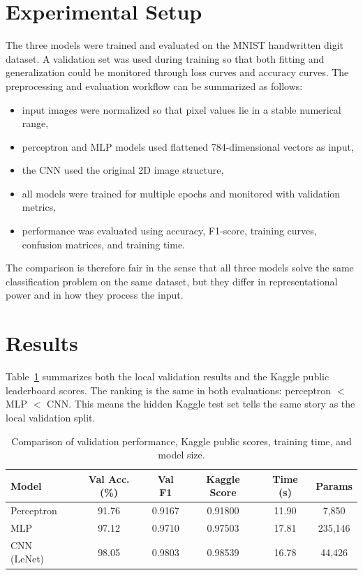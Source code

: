 \documentclass[11pt]{article}
\begin{document}
\section{Experimental Setup}

The three models were trained and evaluated on the MNIST handwritten digit dataset. A validation set was used during training so that both fitting and generalization could be monitored through loss curves and accuracy curves. The preprocessing and evaluation workflow can be summarized as follows:

\begin{itemize}
    \item input images were normalized so that pixel values lie in a stable numerical range,
    \item perceptron and MLP models used flattened 784-dimensional vectors as input,
    \item the CNN used the original 2D image structure,
    \item all models were trained for multiple epochs and monitored with validation metrics,
    \item performance was evaluated using accuracy, F1-score, training curves, confusion matrices, and training time.
\end{itemize}

The comparison is therefore fair in the sense that all three models solve the same classification problem on the same dataset, but they differ in representational power and in how they process the input.

\section{Results}

Table~\ref{tab:results} summarizes both the local validation results and the Kaggle public leaderboard scores. The ranking is the same in both evaluations: perceptron $<$ MLP $<$ CNN. This means the hidden Kaggle test set tells the same story as the local validation split.

\begin{table}[H]
\centering
\small
\setlength{\tabcolsep}{4pt}
\begin{tabular}{lccccc}
\toprule
\textbf{Model} & \textbf{Val Acc. (\%)} & \textbf{Val F1} & \textbf{Kaggle Score} & \textbf{Time (s)} & \textbf{Params} \\
\midrule
Perceptron & 91.76 & 0.9167 & 0.91800 & 11.90 & 7,850 \\
MLP & 97.12 & 0.9710 & 0.97503 & 17.81 & 235,146 \\
CNN (LeNet) & 98.05 & 0.9803 & 0.98539 & 16.78 & 44,426 \\
\bottomrule
\end{tabular}
\caption{Comparison of validation performance, Kaggle public scores, training time, and model size.}
\label{tab:results}
\end{table}
\end{document}
